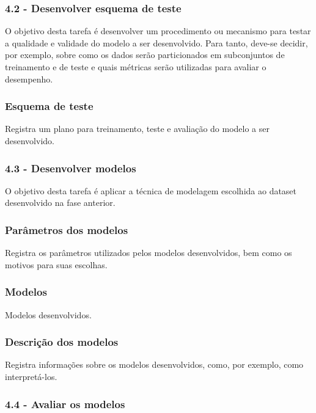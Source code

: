 \subsubsection*{\textbf{4.2 - Desenvolver esquema de teste}}

O objetivo desta tarefa é desenvolver um procedimento ou mecanismo para testar a qualidade e validade do modelo a ser desenvolvido. Para tanto, deve-se decidir, por exemplo, sobre como os dados serão particionados em subconjuntos de treinamento e de teste e quais métricas serão utilizadas para avaliar o desempenho.

\subsubsection*{Esquema de teste}

Registra um plano para treinamento, teste e avaliação do modelo a ser desenvolvido.

\subsubsection*{\textbf{4.3 - Desenvolver modelos}}

O objetivo desta tarefa é aplicar a técnica de modelagem escolhida ao dataset desenvolvido na fase anterior.

\subsubsection*{Parâmetros dos modelos}

Registra os parâmetros utilizados pelos modelos desenvolvidos, bem como os motivos para suas escolhas.

\subsubsection*{Modelos}

Modelos desenvolvidos.

\subsubsection*{Descrição dos modelos}

Registra informações sobre os modelos desenvolvidos, como, por exemplo, como interpretá-los.

\subsubsection*{\textbf{4.4 - Avaliar os modelos}}

